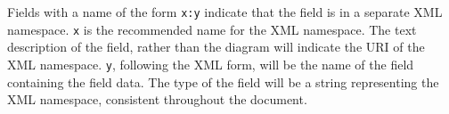 \documentclass[10pt,twocolumntoc]{cekarticle}
\begin{document}
Fields with a name of the form \texttt{x:y} indicate that the
field is in a separate XML namespace.  \texttt{x} is the
recommended name for the XML namespace.  The text description of
the field, rather than the diagram will indicate the URI of the
XML namespace. \texttt{y}, following the XML form, will be the
name of the field containing the field data.  The type of the
field will be a string representing the XML namespace, consistent
throughout the document.

%
%

\clearpage





\end{document}
